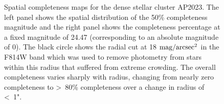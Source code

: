 \documentclass{emulateapj}
\begin{document}
\begin{figure}[!htbp]
\centering
\mbox{}
\caption{Spatial completeness maps for the dense stellar cluster AP2023.  The left panel shows the spatial distribution of the 50\% completeness magnitude and the right panel shows the completeness percentage at a fixed magnitude of 24.47 (corresponding to an absolute magnitude of 0).  The black circle shows the radial cut at 18 ${\rm mag/arcsec^2}$ in the F814W band which was used to remove photometry from stars within this radius that suffered from extreme crowding.  The overall completeness varies sharply with radius, changing from nearly zero completeness to \textgreater\ 80\% completeness over a change in radius of \textless\ 1".}
\label{fig:compmap}
\end{figure}
\end{document}

